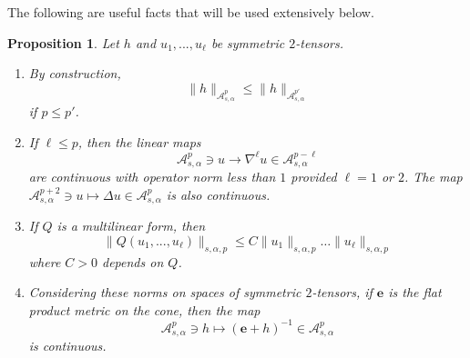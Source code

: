 \documentclass[12pt]{article}
\newtheorem{prop}[thm]{Proposition}
\newcommand{\calA}{{\mathcal A}}
\begin{document}
The following are useful facts that will be used extensively below.
\begin{prop}\label{properties A epsilon k}
Let $h$ and $u_1,...,u_\ell$ be symmetric $2$-tensors. 
\begin{enumerate}
\item By construction, 
\[
\|h\|_{\calA^p_{s,\alpha}}\leqslant \|h\|_{\calA_{s,\alpha}^{p'}}
\]
if $p\leqslant p'$. 
\item If $\ell \leq p$, then the linear maps
\[
\calA^{p}_{s,\alpha} \ni u \longrightarrow \nabla^\ell u\in \calA^{p-\ell}_{s,\alpha}
\]
are continuous with operator norm less than $1$ provided $\ell =1$ or $2$. The map 
$\calA^{p+2}_{s,\alpha} \ni u \mapsto \Delta u \in \calA^{p}_{s,\alpha}$ is also continuous. 
\item If $Q$ is a multilinear form, then%
\[
\|Q(u_1,...,u_\ell)\|_{s,\alpha,p} \leqslant C\|u_1\|_{s,\alpha,p} \ldots \|u_\ell\|_{s,\alpha,p}
\]
where $C>0$ depends on $Q$. 
\item Considering these norms on spaces of symmetric $2$-tensors, if $\mathbf{e}$ is the flat product
metric on the cone, then the map
\[
\calA_{s,\alpha}^p \ni h \mapsto (\mathbf{e}+h)^{-1}\in \calA^p_{s,\alpha} 
\]
is continuous. 
\end{enumerate}
\end{prop}
\end{document}
